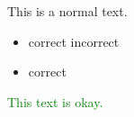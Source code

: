 \documentclass{article}
\begin{document}
This is a normal text.
\begin{itemize}
\item correct
\itWrong incorrect
\item correct
\end{itemize}
\textcolor{green}{This text is okay.}
\end{document}

